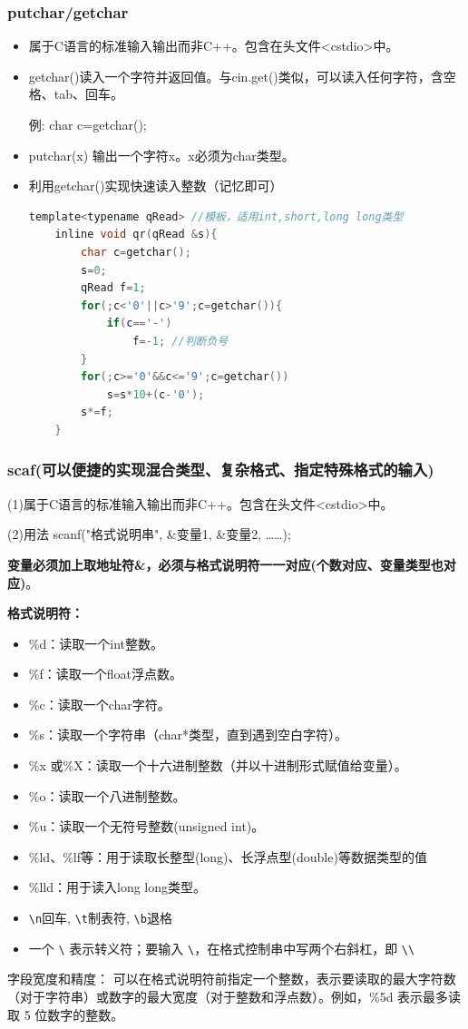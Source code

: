 \documentclass[UTF8]{ctexart}
\begin{document}
\subsubsection{putchar/getchar}
\begin{itemize}
    \item 属于C语言的标准输入输出而非C++。包含在头文件<cstdio>中。
    \item getchar()读入一个字符并返回值。与cin.get()类似，可以读入任何字符，含空格、tab、回车。

    例: char c=getchar();
    \item putchar(x) 输出一个字符x。x必须为char类型。
    \item 利用getchar()实现快速读入整数（记忆即可）
    \begin{lstlisting}[language = C,basicstyle=\small\ttfamily] 
    template<typename qRead> //模板，适用int,short,long long类型
    inline void qr(qRead &s){
        char c=getchar();
        s=0;
        qRead f=1;
        for(;c<'0'||c>'9';c=getchar()){
            if(c=='-')
                f=-1; //判断负号
        }
        for(;c>='0'&&c<='9';c=getchar())
            s=s*10+(c-'0');
        s*=f;
    }
   \end{lstlisting}
\end{itemize}
\subsubsection{scaf(可以便捷的实现混合类型、复杂格式、指定特殊格式的输入)}
(1)属于C语言的标准输入输出而非C++。包含在头文件<cstdio>中。

(2)用法 scanf("格式说明串", \&变量1, \&变量2, ……);

\textbf{变量必须加上取地址符\&，必须与格式说明符一一对应(个数对应、变量类型也对应)}。

\textbf{格式说明符：}
\begin{itemize}
    \item \%d：读取一个int整数。
    \item \%f：读取一个float浮点数。
    \item \%c：读取一个char字符。
    \item \%s：读取一个字符串（char*类型，直到遇到空白字符）。
    \item \%x 或\%X：读取一个十六进制整数（并以十进制形式赋值给变量）。
    \item \%o：读取一个八进制整数。
    \item \%u：读取一个无符号整数(unsigned int)。
    \item \%ld、\%lf等：用于读取长整型(long)、长浮点型(double)等数据类型的值
    \item \%lld：用于读入long long类型。
    \item \verb|\n|回车, \verb|\t|制表符, \verb|\b|退格
    \item 一个 \verb|\| 表示转义符；要输入 \verb|\|，在格式控制串中写两个右斜杠，即 \verb|\\| 
\end{itemize}
字段宽度和精度：
可以在格式说明符前指定一个整数，表示要读取的最大字符数（对于字符串）或数字的最大宽度（对于整数和浮点数）。例如，\%5d 表示最多读取 5 位数字的整数。
\end{document}
